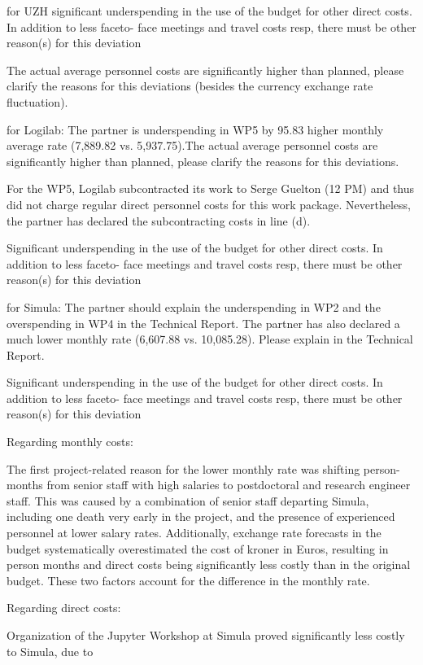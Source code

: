 for UZH
significant underspending in the use of the budget for other direct costs. In addition to less faceto-
face meetings and travel costs resp, there must be other reason(s) for this deviation

The actual average personnel costs are significantly higher than planned, 
please clarify the reasons for this deviations (besides the currency exchange rate fluctuation).

for Logilab:
The partner is underspending in WP5 by 95.83%
higher monthly average rate (7,889.82 vs. 5,937.75).The actual average personnel costs are significantly higher than planned, 
please clarify the reasons for this deviations.

For the WP5, Logilab subcontracted its work to Serge Guelton (12 PM) and thus  did not charge regular direct personnel costs for this work package. Nevertheless, the partner has declared the subcontracting costs in line (d).

Significant underspending in the use of the budget for other direct costs. In addition to less faceto-
face meetings and travel costs resp, there must be other reason(s) for this deviation


for Simula:
The partner should explain the underspending in WP2 and the overspending in WP4 in the
Technical Report. The partner has also declared a much lower monthly rate (6,607.88 vs. 10,085.28). Please explain in the Technical Report.

Significant underspending in the use of the budget for other direct costs. In addition to less faceto-
face meetings and travel costs resp, there must be other reason(s) for this deviation

Regarding monthly costs:

The first project-related reason for the lower monthly rate was shifting person-months from senior staff with high salaries
to postdoctoral and research engineer staff.
This was caused by a combination of senior staff departing Simula, including one death very early in the project,
and the presence of experienced personnel at lower salary rates.
Additionally, exchange rate forecasts in the budget systematically overestimated the cost of kroner in Euros,
resulting in person months and direct costs being significantly less costly than in the original budget.
These two factors account for the difference in the monthly rate.

Regarding direct costs:

Organization of the Jupyter Workshop at Simula proved significantly less costly to Simula, due to

